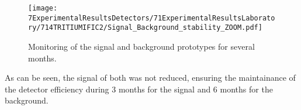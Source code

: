 \begin{figure}[h]
\centering
\texttt{[image: 7ExperimentalResultsDetectors/71ExperimentalResultsLaboratory/714TRITIUMIFIC2/Signal\_Background\_stability\_ZOOM.pdf]}
\caption{Monitoring of the signal and background prototypes for several months.\label{fig:MonitorizationTRITIUMIFIC2}}
\end{figure}

As can be seen, the signal of both was not reduced, ensuring the maintainance of the detector efficiency during 3 months for the signal and 6 months for the background.







